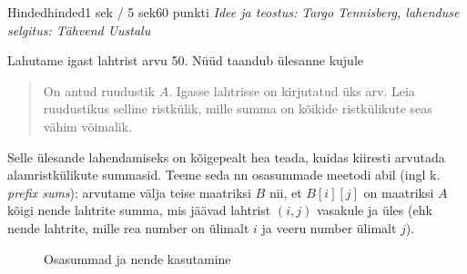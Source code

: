 \begin{yl}{5}{Hinded}{hinded}{1 sek / 5 sek}{60 punkti}
  \emph{Idee ja teostus: Targo Tennisberg, lahenduse selgitus: Tähvend Uustalu}

  Lahutame igast lahtrist arvu 50. Nüüd taandub ülesanne kujule
  \begin{quote}
    On antud ruudustik $A$. Igasse lahtrisse on kirjutatud üks arv.
    Leia ruudustikus selline ristkülik, mille summa on kõikide ristkülikute seas vähim võimalik.
  \end{quote}

  Selle ülesande lahendamiseks on kõigepealt hea teada, kuidas kiiresti
  arvutada alamristkülikute summasid. Teeme seda nn osasummade meetodi
  abil (ingl k. \textit{prefix sums}): arvutame välja teise maatriksi $B$ nii, et
  $B[i][j]$ on maatriksi $A$ kõigi nende lahtrite summa, mis jäävad lahtrist
  $(i, j)$ vasakule ja üles (ehk nende lahtrite, mille rea number on ülimalt
  $i$ ja veeru number ülimalt $j$).

  \begin{figure}[h]
    \centering
    \qquad
    \caption{Osasummad ja nende kasutamine}
  \end{figure}


\end{yl}
